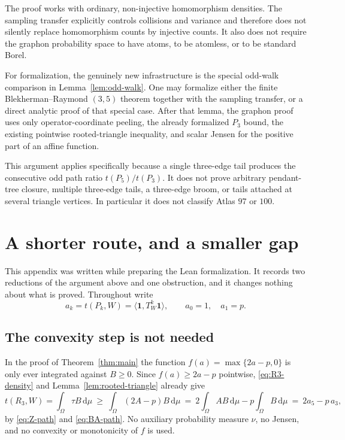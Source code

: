 \documentclass[11pt]{article}
\newcommand{\dd}{\,\mathrm d}
\begin{document}
The proof works with ordinary, non-injective homomorphism densities.  The
sampling transfer explicitly controls collisions and variance and therefore
does not silently replace homomorphism counts by injective counts.  It also
does not require the graphon probability space to have atoms, to be atomless,
or to be standard Borel.

For formalization, the genuinely new infrastructure is the special
odd-walk comparison in Lemma~\ref{lem:odd-walk}.  One may formalize either
the finite Blekherman--Raymond $(3,5)$ theorem together with the sampling
transfer, or a direct analytic proof of that special case.  After that lemma,
the graphon proof uses only operator-coordinate peeling, the already
formalized $P_3$ bound, the existing pointwise rooted-triangle inequality,
and scalar Jensen for the positive part of an affine function.

This argument applies specifically because a single three-edge tail produces
the consecutive odd path ratio $t(P_5)/t(P_3)$.  It does not prove arbitrary
pendant-tree closure, multiple three-edge tails, a three-edge broom, or tails
attached at several triangle vertices.  In particular it does not classify
Atlas $97$ or $100$.


\appendix
\section{A shorter route, and a smaller gap}
\label{sec:shorter}

This appendix was written while preparing the Lean formalization.  It records
two reductions of the argument above and one obstruction, and it changes
nothing about what is proved.  Throughout write
\[
 a_k=t(P_k,W)=\langle\mathbf1,T_W^k\mathbf1\rangle,
 \qquad a_0=1,\quad a_1=p .
\]

\subsection{The convexity step is not needed}

In the proof of Theorem~\ref{thm:main} the function $f(a)=\max\{2a-p,0\}$ is
only ever integrated against $B\geq0$.  Since $f(a)\geq2a-p$ pointwise,
\eqref{eq:R3-density} and Lemma~\ref{lem:rooted-triangle} already give
\begin{equation}
 t(R_3,W)=\int_\Omega\tau B\dd\mu
 \ \geq\ \int_\Omega(2A-p)B\dd\mu
 \ =\ 2\int_\Omega AB\dd\mu-p\int_\Omega B\dd\mu
 \ =\ 2a_5-p\,a_3 ,
 \label{eq:jensen-free}
\end{equation}
by \eqref{eq:Z-path} and \eqref{eq:BA-path}.  No auxiliary probability measure
$\nu$, no Jensen, and no convexity or monotonicity of $f$ is used.
\end{document}
